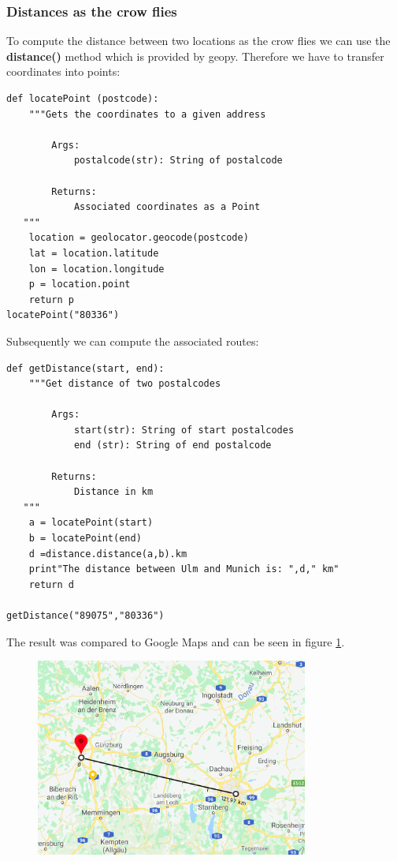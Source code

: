 \documentclass[12pt]{article}
\begin{document}
\subsubsection{Distances as the crow flies}
To compute the distance between two locations as the crow flies we can use the \textbf{distance()} method which is provided by geopy.  Therefore we have to transfer coordinates into points:
\begin{lstlisting}[breaklines=true]
def locatePoint (postcode):
    """Gets the coordinates to a given address
        
        Args: 
            postalcode(str): String of postalcode
	        
        Returns: 
            Associated coordinates as a Point
   """
    location = geolocator.geocode(postcode)
    lat = location.latitude
    lon = location.longitude
    p = location.point
    return p
locatePoint("80336")
\end{lstlisting}
Subsequently we can compute the associated routes:
\begin{lstlisting}[breaklines=true]
def getDistance(start, end):
    """Get distance of two postalcodes
        
        Args: 
            start(str): String of start postalcodes
            end (str): String of end postalcode
	        
        Returns: 
            Distance in km 
   """
    a = locatePoint(start)
    b = locatePoint(end)
    d =distance.distance(a,b).km
    print"The distance between Ulm and Munich is: ",d," km"
    return d
    
getDistance("89075","80336")
\end{lstlisting}
The result was compared to Google Maps and can be seen in figure \ref{fig:fly}.
\begin{figure}[H]
\hspace{1.3cm}
\includegraphics[width=0.8\textwidth]{img/fly}
\label{fig:fly}
\end{figure}
\end{document}
